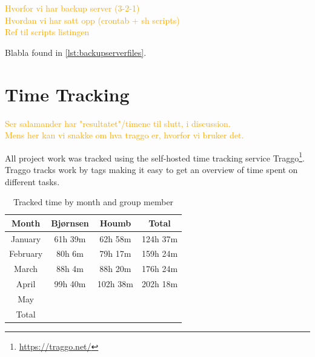\textcolor{orange}{
Hvorfor vi har backup server (3-2-1) \\
Hvordan vi har satt opp (crontab + sh scripts) \\
Ref til scripts listingen
}

\begin{figure}[h]

\end{figure}

Blabla found in \autoref{lst:backupserverfiles}.

\begin{figure}[h]

\end{figure}

\section{Time Tracking}

\textcolor{orange}{
Ser salamander har "resultatet"/timene til slutt, i discussion. \\
Mens her kan vi snakke om hva traggo er, hvorfor vi bruker det.
}

All project work was tracked using the self-hosted time tracking service Traggo\footnote{\url{https://traggo.net/}}. Traggo tracks work by tags making it easy to get an overview of time spent on different tasks.

\begin{table}[h]
    \centering
    \begin{tabular}{c|c|c|c}
        \hline
        \textbf{Month} & \textbf{Bjørnsen} & \textbf{Houmb} & \textbf{Total} \\
        \hline
        January  & 61h 39m  & 62h 58m  & 124h 37m \\
        February & 80h 6m   & 79h 17m  & 159h 24m \\
        March    & 88h 4m   & 88h 20m  & 176h 24m \\
        April    & 99h 40m  & 102h 38m  & 202h 18m \\
        May      &        &        &        \\
        \hline
        Total & & & \\
        \hline
    \end{tabular}
    \caption{Tracked time by month and group member}
    \label{tab:timetrackedbymember}
\end{table}

